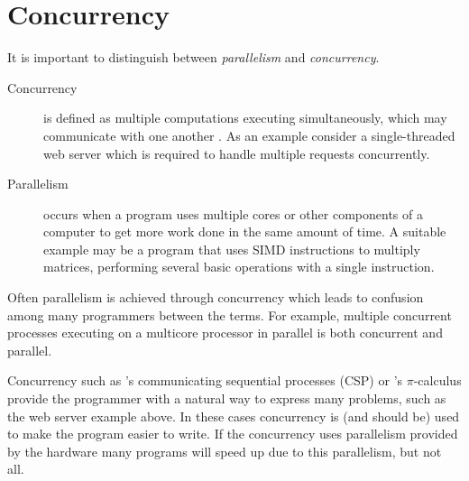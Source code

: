 
%


\section{Concurrency}
\label{sec:backgnd_concurrency}

It is important to distinguish between \emph{parallelism} and
\emph{concurrency}.

\begin{description}
    \item[Concurrency] is defined as multiple computations executing simultaneously,
    which may communicate with one another \citep{hoare:1978:csp}.
    As an example consider a single-threaded web server which is required to
    handle multiple requests concurrently.

    \item[Parallelism] occurs when a program uses multiple cores or other
    components of a computer to get more work done in the same amount of
    time.
    A suitable example may be a program that uses SIMD instructions to
    multiply matrices, performing several basic operations with a single
    instruction.
\end{description}

\noindent
Often parallelism is achieved through concurrency
which leads to confusion among many programmers between the terms.
For example,
multiple concurrent processes executing on a multicore processor in parallel
is both concurrent and parallel.

Concurrency such as \citet{hoare:1978:csp}'s
communicating sequential processes (CSP)
or \citet{milner:pi}'s $\pi$-calculus
provide the programmer with a natural way to express many problems,
such as the web server example above.
In these cases concurrency is (and should be) used to make the program
easier to write.
If the concurrency uses parallelism provided by the hardware many programs
will speed up due to this parallelism,
but not all.

